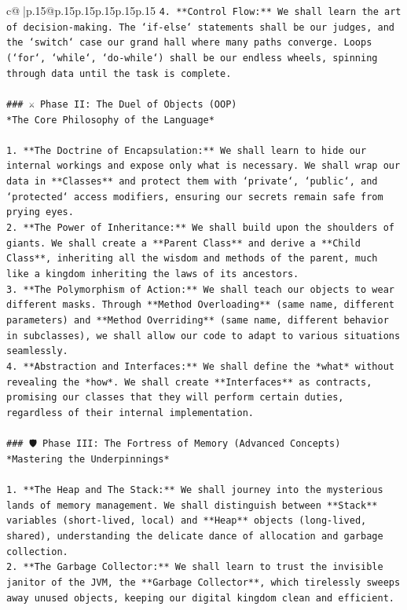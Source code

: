 \documentclass{article}
\begin{document}
{\begin{supertabular}{c@{$\;$}|p{.15\linewidth}@{}p{.15\linewidth}p{.15\linewidth}p{.15\linewidth}p{.15\linewidth}p{.15\linewidth}}
{{{\texttt{4.  **Control Flow:** We shall learn the art of decision{-}making. The `if{-}else` statements shall be our judges, and the `switch` case our grand hall where many paths converge. Loops (`for`, `while`, `do{-}while`) shall be our endless wheels, spinning through data until the task is complete.} \\
\\ 
\texttt{\#\#\# ⚔️ Phase II: The Duel of Objects (OOP)} \\
\texttt{*The Core Philosophy of the Language*} \\
\\ 
\texttt{1.  **The Doctrine of Encapsulation:** We shall learn to hide our internal workings and expose only what is necessary. We shall wrap our data in **Classes** and protect them with `private`, `public`, and `protected` access modifiers, ensuring our secrets remain safe from prying eyes.} \\
\texttt{2.  **The Power of Inheritance:** We shall build upon the shoulders of giants. We shall create a **Parent Class** and derive a **Child Class**, inheriting all the wisdom and methods of the parent, much like a kingdom inheriting the laws of its ancestors.} \\
\texttt{3.  **The Polymorphism of Action:** We shall teach our objects to wear different masks. Through **Method Overloading** (same name, different parameters) and **Method Overriding** (same name, different behavior in subclasses), we shall allow our code to adapt to various situations seamlessly.} \\
\texttt{4.  **Abstraction and Interfaces:** We shall define the *what* without revealing the *how*. We shall create **Interfaces** as contracts, promising our classes that they will perform certain duties, regardless of their internal implementation.} \\
\\ 
\texttt{\#\#\# 🛡️ Phase III: The Fortress of Memory (Advanced Concepts)} \\
\texttt{*Mastering the Underpinnings*} \\
\\ 
\texttt{1.  **The Heap and The Stack:** We shall journey into the mysterious lands of memory management. We shall distinguish between **Stack** variables (short{-}lived, local) and **Heap** objects (long{-}lived, shared), understanding the delicate dance of allocation and garbage collection.} \\
\texttt{2.  **The Garbage Collector:** We shall learn to trust the invisible janitor of the JVM, the **Garbage Collector**, which tirelessly sweeps away unused objects, keeping our digital kingdom clean and efficient.} \\
}}}
\end{supertabular}}
\end{document}
